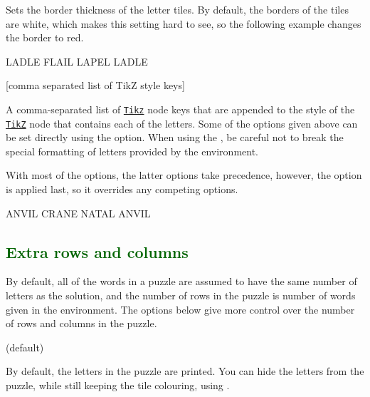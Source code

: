 \documentclass[svgnames]{report}
\newcommand\ctan[1]{\href{https://www.ctan.org/pkg/#1}{\texttt{#1}}}
\newcommand\Section[1]{\subsection{\textcolor{DarkGreen}{#1}}}
\begin{document}
  Sets the border thickness of the  letter tiles.  By
  default, the borders of the tiles are white, which makes this setting
  hard to see, so the following example changes the border to red.

  \begin{example}
    \begin{wordle}[thickness=1mm, borders=red]{LADLE}
       FLAIL
       LAPEL
       LADLE
    \end{wordle}
  \end{example}

  [comma separated list of TikZ style keys]

  A comma-separated list of \ctan{Tikz} node keys that are appended to
  the style of the \ctan{TikZ} node that contains each of the
   letters.  Some of the options given above can be set
  directly using the  option. When using the
  , be careful not to break the special formatting of
  letters provided by the  environment.\par

  With most of the  options, the latter options take
  precedence, however, the  option is applied last,
  so it overrides any competing options.

  \begin{example}
    \begin{wordle}[tile style={rotate=45}]{ANVIL}
      CRANE
      NATAL
      ANVIL
    \end{wordle}
  \end{example}

  \Section{Extra rows and columns}

  By default, all of the words in a  puzzle are assumed
  to have the same number of letters as the solution, and the number of
  rows in the puzzle is number of words given in the environment. The
  options below give more control over the number of rows and columns in
  the puzzle.

   (default)\qquad

  By default, the letters in the puzzle are printed. You can hide the
  letters from the puzzle, while still keeping the  tile
  colouring, using .
\end{document}
